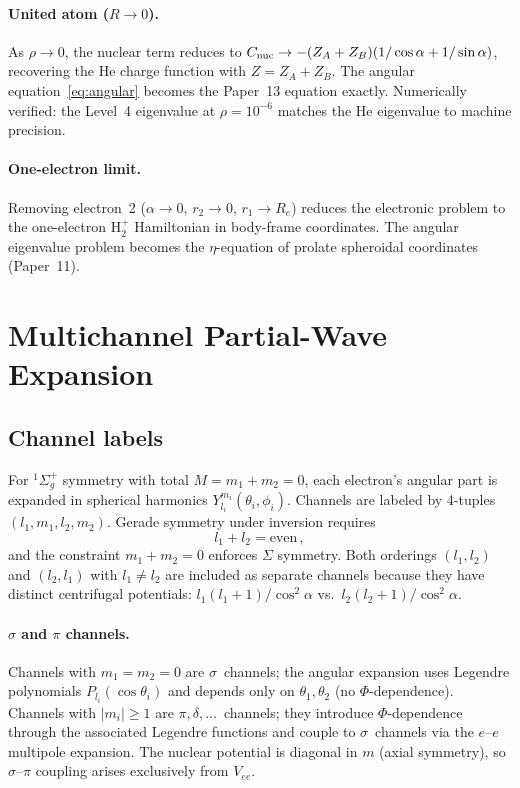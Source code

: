 \documentclass[aps,pra,twocolumn,superscriptaddress,longbibliography]{revtex4-2}
\begin{document}
\paragraph{United atom ($R\to 0$).}
As $\rho \to 0$, the nuclear term reduces to
$C_{\rm nuc} \to -(Z_A+Z_B)(1/\cos\alpha + 1/\sin\alpha)$,
recovering the He charge function with $Z = Z_A + Z_B$.
The angular equation~\eqref{eq:angular} becomes the Paper~13 equation
exactly.  Numerically verified: the Level~4 eigenvalue at
$\rho = 10^{-6}$ matches the He eigenvalue to machine precision.

\paragraph{One-electron limit.}
Removing electron~2 ($\alpha \to 0$, $r_2 \to 0$, $r_1 \to R_e$)
reduces the electronic problem to the one-electron H$_2^+$ Hamiltonian
in body-frame coordinates.  The angular eigenvalue problem becomes the
$\eta$-equation of prolate spheroidal coordinates (Paper~11).

\section{Multichannel Partial-Wave Expansion}
\label{sec:multichannel}

\subsection{Channel labels}

For $^1\Sigma_g^+$ symmetry with total $M = m_1 + m_2 = 0$, each
electron's angular part is expanded in spherical harmonics
$Y_{l_i}^{m_i}(\theta_i,\phi_i)$.  Channels are labeled by
4-tuples $(l_1,m_1,l_2,m_2)$.  Gerade symmetry under inversion requires
\begin{equation}
  l_1 + l_2 = \text{even}\,,
  \label{eq:gerade}
\end{equation}
and the constraint $m_1 + m_2 = 0$ enforces $\Sigma$ symmetry.
Both orderings $(l_1,l_2)$ and $(l_2,l_1)$ with $l_1 \ne l_2$ are
included as separate channels because they have distinct centrifugal
potentials: $l_1(l_1+1)/\cos^2\!\alpha$ vs.\ $l_2(l_2+1)/\cos^2\!\alpha$.

\paragraph{$\sigma$ and $\pi$ channels.}
Channels with $m_1 = m_2 = 0$ are $\sigma$~channels; the angular
expansion uses Legendre polynomials $P_{l_i}(\cos\theta_i)$ and
depends only on $\theta_1,\theta_2$ (no $\Phi$-dependence).
Channels with $|m_i| \ge 1$ are $\pi,\delta,\ldots$~channels;
they introduce $\Phi$-dependence through the associated Legendre
functions and couple to $\sigma$~channels via the $e$--$e$ multipole
expansion.  The nuclear potential is diagonal in $m$ (axial symmetry),
so $\sigma$--$\pi$ coupling arises exclusively from $V_{ee}$.
\end{document}
